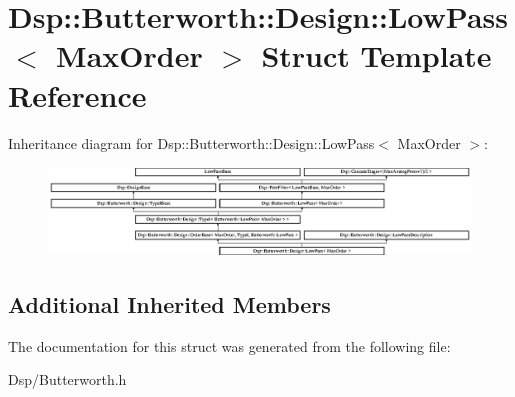 \hypertarget{structDsp_1_1Butterworth_1_1Design_1_1LowPass}{\section{Dsp\-:\-:Butterworth\-:\-:Design\-:\-:Low\-Pass$<$ Max\-Order $>$ Struct Template Reference}
\label{structDsp_1_1Butterworth_1_1Design_1_1LowPass}
}
Inheritance diagram for Dsp\-:\-:Butterworth\-:\-:Design\-:\-:Low\-Pass$<$ Max\-Order $>$\-:\begin{figure}[H]
\begin{center}
\leavevmode
\includegraphics[height=2.352941cm]{structDsp_1_1Butterworth_1_1Design_1_1LowPass}
\end{center}
\end{figure}
\subsection*{Additional Inherited Members}


The documentation for this struct was generated from the following file\-:\begin{DoxyCompactItemize}
\item 
Dsp/Butterworth.\-h\end{DoxyCompactItemize}
